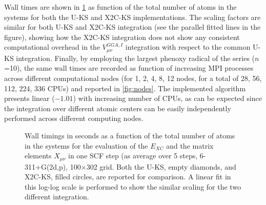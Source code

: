 Wall times are shown in \cref{fig:timing} as function of the total number of atoms in the systems for both the U-KS and X2C-KS implementations.
The scaling factors are similar for both U-KS and X2C-KS integration (see the parallel fitted lines in the figure), showing how the  X2C-KS integration does not show any consistent computational overhead in the   $V^{GGA,I}_{\mu\nu}$ integration with
respect to the common U-KS integration. 
Finally, by employing the largest phenoxy radical of the series ($n$=10), the same wall times are recorded as function of increasing MPI processes across different computational nodes (for 1, 2, 4, 8, 12 nodes, for a total 
of 28, 56, 112, 224, 336 CPUs) and reported in \cref{fig:nodes}. 
The implemented algorithm presents linear ($-1.01$) with increasing number of CPUs, as can be expected since the integration over different atomic centers can be easily independently performed across different computing nodes.
\begin{figure}
\begin{center}
\end{center}
\caption{Wall timings in seconds as a function of the total number of atoms in the systems for the evaluation of the $E_{XC}$ and the matrix elements $X_{\mu \nu}$ in one SCF step (as average over 5 steps, 6-311+G(2d,p), 100$\times$302 grid.
  Both the U-KS, empty diamonds, and X2C-KS, filled circles, are reported for comparison. A linear fit in this log-log scale is performed to show the similar scaling for the two different integration. 
}
\label{fig:timing}     
\end{figure}

